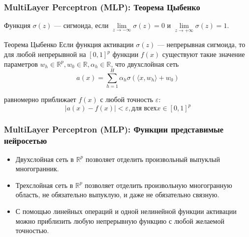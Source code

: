 \documentclass[11pt]{beamer}
\begin{document}
	\begin{frame}
		\frametitle{MultiLayer Perceptron (MLP): Теорема Цыбенко}
		
		Функция $\sigma(z)$ --- сигмоида, если $\lim\limits_{z 	\rightarrow -\infty}\sigma(z) = 0$ и $\lim\limits_{z 	\rightarrow +\infty}\sigma(z) = 1$.
		
		\begin{block}{Теорема Цыбенко}
			Если функция активации $\sigma(z)$ --- непрерывная сигмоида, то для любой непрерывной на $[0, 1]^p$ функции $f(x)$ существуют такие значение параметров $w_h \in \mathbb{R}^p, w_0 \in \mathbb{R}, \alpha_h \in \mathbb{R} $, что двухслойная сеть 
			$$ a(x) = \sum\limits_{h=1}^H \alpha_h \sigma( \langle x, w_h \rangle + w_0) $$
			
			равномерно приближает $f(x)$ с любой точность $\varepsilon$:
			$$ |a(x) - f(x)| < \varepsilon, \text{для всех} x \in [0, 1]^p $$
		\end{block}
		
		
	\end{frame}

		\begin{frame}
		\frametitle{MultiLayer Perceptron (MLP): Функции представимые нейросетью}

		\begin{itemize}
			\item Двухслойная сеть в $\mathbb{R}^p$ позволяет отделить произвольный выпуклый многогранник.
			\item Трехслойная сеть в $\mathbb{R}^p$ позволяет отделить произвольную многогранную область, не обязательно выпуклую, и даже не обязательно связную.
			\item С помощью линейных операций и одной нелинейной функции активации можно приблизить любую непрерывную функцию с любой желаемой точностью.
		\end{itemize}
		
		
		
	\end{frame}
\end{document}
